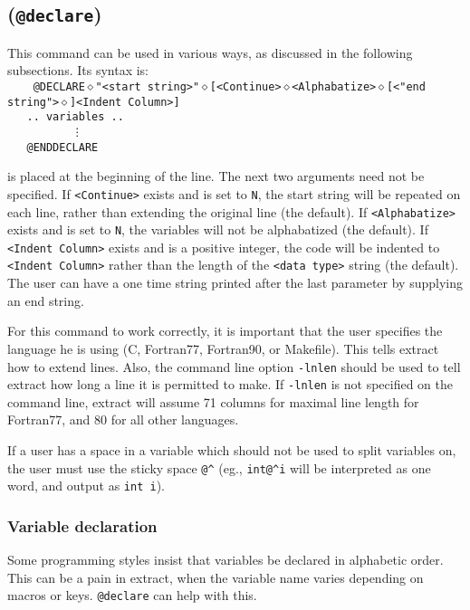 \subsection{({\tt @declare})}
This command can be used in various ways, as discussed in the following
subsections.  Its syntax is:\\
\noindent
{\tt
\verb+   +@DECLARE$\diamond$\verb+"<start string>"+$\diamond$[<Continue>$\diamond$<Alphabatize>$\diamond$[<"end string">$\diamond$]<Indent Column>]\\
\verb+   .. variables ..+\\
\verb+         + \vdots\\
\verb+   +@ENDDECLARE\\
}

{\tt <start string>} is placed at the beginning of the line.
The next two arguments need not be specified.
If \verb+<Continue>+ exists and is set to \verb+N+, the start string will be
repeated on each line, rather than extending the original line (the default).
If \verb+<Alphabatize>+ exists and is set to \verb+N+, the variables will
not be alphabatized (the default).  If \verb+<Indent Column>+ exists and is a 
positive integer, the code will be indented to \verb+<Indent Column>+ rather
than the length of the \verb+<data type>+ string (the default).  The user can
have a one time string printed after the last parameter by supplying an
end string.

For this command to work correctly, it is important that the user specifies
the language he is using (C, Fortran77, Fortran90, or Makefile).  This tells
extract how to extend lines.  Also, the command line option {\tt -lnlen} should
be used to tell extract how long a line it is permitted to make.  If 
{\tt -lnlen} is not specified on the command line, extract will assume 71
columns for maximal line length for Fortran77, and 80 for all other languages.

If a user has a space in a variable which should not be used to split
variables on,
the user must use the sticky space \verb+@^+ (eg., \verb+int@^i+ will be
interpreted as one word, and output as {\tt int i}).

\subsubsection{Variable declaration}
\noindent

Some programming styles insist that variables be declared in alphabetic
order.  This can be a pain in extract, when the variable name varies 
depending on macros or keys.  {\tt @declare} can help with this.

